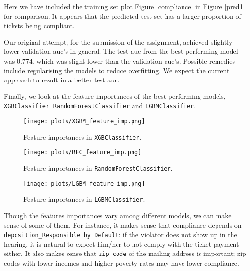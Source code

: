 \documentclass[12pt,letterpaper]{article}
\numberwithin{equation}{section}
\begin{document}
Here we have included the training set plot \hyperref[compliance]{Figure \ref*{compliance}} in \hyperref[pred1]{Figure \ref*{pred1}} for comparison. It appears that the predicted test set has a larger proportion of tickets being compliant.

Our original attempt, for the submission of the assignment, achieved slightly lower validation auc's in general. The test auc from the best performing model was $0.774$, which was slight lower than the validation auc's. Possible remedies include regularising the models to reduce overfitting. We expect the current approach to result in a better test auc.

Finally, we look at the feature importances of the best performing models, \verb|XGBClassifier|, \verb|RandomForestClassifier| and \verb|LGBMClassifier|.

\begin{figure}[H]
\begin{center}
\texttt{[image: plots/XGBM\_feature\_imp.png]}
\caption{Feature importances in \texttt{XGBClassifier}.}\label{xgbmfeat}
\end{center}
\end{figure}

\begin{figure}[H]
\begin{center}
\texttt{[image: plots/RFC\_feature\_imp.png]}
\caption{Feature importances in \texttt{RandomForestClassifier}.}\label{rfcfeat}
\end{center}
\end{figure}

\begin{figure}[H]
\begin{center}
\texttt{[image: plots/LGBM\_feature\_imp.png]}
\caption{Feature importances in \texttt{LGBMClassifier}.}\label{lgbmfeat}
\end{center}
\end{figure}

\vspace*{-12pt}

Though the features importances vary among different models, we can make sense of some of them. For instance, it makes sense that compliance depends on \\\verb|deposition_Responsible by Default|: if the violator does not show up in the hearing, it is natural to expect him/her to not comply with the ticket payment either. It also makes sense that \verb|zip_code| of the mailing address is important; zip codes with lower incomes and higher poverty rates may have lower compliance. 
\end{document}

